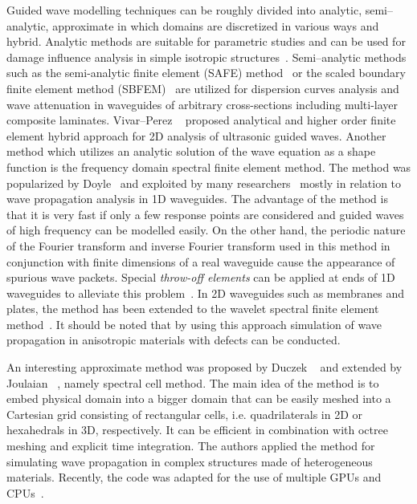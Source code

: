 \documentclass[12pt]{iopart}
\begin{document}
Guided wave modelling techniques can be roughly divided into analytic, semi--analytic, approximate in which domains are discretized in various ways and hybrid. Analytic methods are suitable for parametric studies and can be used for damage influence analysis in simple isotropic structures~\cite{Giurgiutiu2014}. Semi--analytic methods such as the semi-analytic finite element (SAFE) method~\cite{Bartoli2006} or the scaled boundary finite element method (SBFEM)~\cite{Gravenkamp2014} are utilized for dispersion curves analysis and wave attenuation in waveguides of arbitrary cross-sections including multi-layer composite laminates. Vivar--Perez \etal~\cite{Vivar-Perez2014} proposed analytical and higher order finite element hybrid approach for 2D analysis of ultrasonic guided waves. Another method which utilizes an analytic solution of the wave equation as a shape function is the frequency domain spectral finite element method. The method was popularized by Doyle~\cite{Doyle1989} and exploited by many researchers~\cite{RoyMahapatra2003,Palacz2005} mostly in relation to wave propagation analysis in 1D waveguides. The advantage of the method is that it is very fast if only a few response points are considered and guided waves of high frequency can be modelled easily. On the other hand, the periodic nature of the Fourier transform and inverse Fourier transform used in this method in conjunction with finite dimensions of a real waveguide cause the appearance of spurious wave packets. Special \emph{throw-off elements} can be applied at ends of 1D waveguides to alleviate this problem~\cite{Doyle1989}. In 2D waveguides such as membranes and plates, the method has been extended to the wavelet spectral finite element method~\cite{Mitra2008,Yang2016}. It should be noted that by using this approach simulation of wave propagation in anisotropic materials with defects can be conducted.

An interesting approximate method was proposed by Duczek \etal~\cite{Duczek2014} and extended by Joulaian \etal~\cite{Joulaian2014}, namely spectral cell method. The main idea of the method is to embed physical domain into a bigger domain that can be easily meshed into a Cartesian grid consisting of rectangular cells, i.e. quadrilaterals in 2D or hexahedrals in 3D, respectively. It can be efficient in combination with octree meshing and explicit time integration. The authors applied the method for simulating wave propagation in complex structures made of heterogeneous materials. Recently, the code was adapted for the use of multiple GPUs and CPUs~\cite{Mossaiby2019}. 
\end{document}
